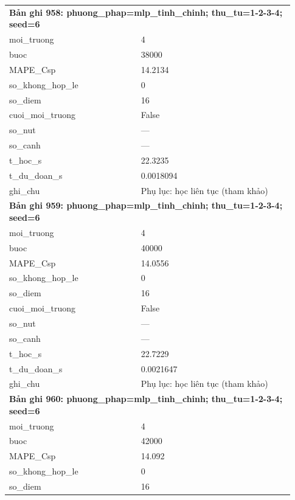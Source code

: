 \begin{longtable}{p{0.43\linewidth}p{0.50\linewidth}}
\midrule
\multicolumn{2}{p{0.95\linewidth}}{\textbf{Bản ghi 958: phuong\_phap=mlp\_tinh\_chinh; thu\_tu=1-2-3-4; seed=6}} \\
moi\_\allowbreak truong & 4 \\
buoc & 38000 \\
MAPE\_\allowbreak Csp & 14.2134 \\
so\_\allowbreak khong\_\allowbreak hop\_\allowbreak le & 0 \\
so\_\allowbreak diem & 16 \\
cuoi\_\allowbreak moi\_\allowbreak truong & False \\
so\_\allowbreak nut & — \\
so\_\allowbreak canh & — \\
t\_\allowbreak hoc\_\allowbreak s & 22.3235 \\
t\_\allowbreak du\_\allowbreak doan\_\allowbreak s & 0.0018094 \\
ghi\_\allowbreak chu & Phụ lục: học liên tục (tham khảo) \\
\midrule
\multicolumn{2}{p{0.95\linewidth}}{\textbf{Bản ghi 959: phuong\_phap=mlp\_tinh\_chinh; thu\_tu=1-2-3-4; seed=6}} \\
moi\_\allowbreak truong & 4 \\
buoc & 40000 \\
MAPE\_\allowbreak Csp & 14.0556 \\
so\_\allowbreak khong\_\allowbreak hop\_\allowbreak le & 0 \\
so\_\allowbreak diem & 16 \\
cuoi\_\allowbreak moi\_\allowbreak truong & False \\
so\_\allowbreak nut & — \\
so\_\allowbreak canh & — \\
t\_\allowbreak hoc\_\allowbreak s & 22.7229 \\
t\_\allowbreak du\_\allowbreak doan\_\allowbreak s & 0.0021647 \\
ghi\_\allowbreak chu & Phụ lục: học liên tục (tham khảo) \\
\midrule
\multicolumn{2}{p{0.95\linewidth}}{\textbf{Bản ghi 960: phuong\_phap=mlp\_tinh\_chinh; thu\_tu=1-2-3-4; seed=6}} \\
moi\_\allowbreak truong & 4 \\
buoc & 42000 \\
MAPE\_\allowbreak Csp & 14.092 \\
so\_\allowbreak khong\_\allowbreak hop\_\allowbreak le & 0 \\
so\_\allowbreak diem & 16 \\

\end{longtable}

